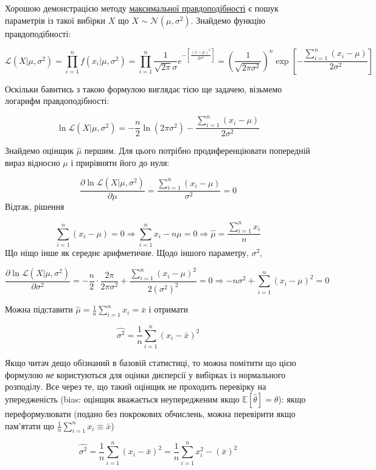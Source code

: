 \documentclass[
  11pt,
]{book}
\begin{document}
Хорошою демонстрацією методу \hyperref[mle]{максимальної правдоподібності} є пошук параметрів із такої вибірки \(X\) що \(X \sim \mathcal{N}(\mu, \sigma^2)\). Знайдемо функцію правдоподібності:

\[\mathcal{L}(X | \mu, \sigma^2) = \prod \limits_{i=1}^n f(x_i| \mu, \sigma^2) = \prod \limits_{i=1}^n \frac{1}{\sqrt{2 \pi} \sigma} e^{-\left[ \frac{(x - \mu)^2}{2 \sigma^2} \right]} = \left( \frac{1}{\sqrt{2 \pi \sigma^2}} \right)^n \exp \left[ - \frac{\sum \limits_{i=1}^n (x_i - \mu)}{2 \sigma^2} \right]\]

Оскільки бавитись з такою формулою виглядає тією ще задачею, візьмемо логарифм правдоподібності:

\[\ln \mathcal{L}(X | \mu, \sigma^2) = - \frac{n}{2} \ln{(2 \pi \sigma^2)} - \frac{\sum \limits_{i=1}^n (x_i - \mu)}{2 \sigma^2}\]

Знайдемо оцінщик \(\hat{\mu}\) першим. Для цього потрібно продиференціювати попередній вираз відносно \(\mu\) і прирівняти його до нуля:

\[\frac{\partial \ln \mathcal{L}(X | \mu, \sigma^2)}{\partial \mu} = \frac{\sum \limits_{i=1}^n (x_i - \mu)}{\sigma^2} = 0\]
Відтак, рішення

\[\sum \limits_{i=1}^n (x_i - \mu) = 0 \Rightarrow \sum \limits_{i=1}^n x_i - n \mu = 0 \Rightarrow \hat{\mu} = \frac{\sum \limits_{i=1}^n x_i}{n}\]
Що ніщо інше як середнє арифметичне. Щодо іншого параметру, \(\sigma^2\),

\[\frac{\partial \ln \mathcal{L}(X | \mu, \sigma^2)}{\partial \sigma^2} = - \frac{n}{2} \cdot \frac{2 \pi}{2 \pi \sigma^2} + \frac{\sum \limits_{i=1}^n (x_i - \mu)^2}{2 (\sigma^2)^2} = 0 \Rightarrow -n \sigma^2 + \sum \limits_{i=1}^n (x_i - \mu)^2 = 0\]

Можна підставити \(\hat{\mu} = \frac{1}{n} \sum \limits_{i=1}^n x_i = \bar{x}\) і отримати

\[\hat{\sigma^2} = \frac{1}{n} \sum \limits_{i=1}^n (x_i - \bar{x})^2\]

Якщо читач дещо обізнаний в базовій статистиці, то можна помітити що цією формулою \emph{не} користуються для оцінки дисперсії у вибірках із нормального розподілу. Все через те, що такий оцінщик не проходить перевірку на упередженість (bias: оцінщик вважається неупередженим якщо \(\mathbb{E}[\hat{\theta}] = \theta\)): якщо переформулювати (подано без покрокових обчислень, можна перевірити якщо пам'ятати що \(\frac{1}{n} \sum \limits_{i=1}^n x_i \equiv \bar{x}\))

\[\hat{\sigma^2} = \frac{1}{n} \sum \limits_{i=1}^n (x_i - \bar{x})^2 = \frac{1}{n} \sum \limits_{i=1}^n x_i^2 - (\bar{x})^2\]
\end{document}
